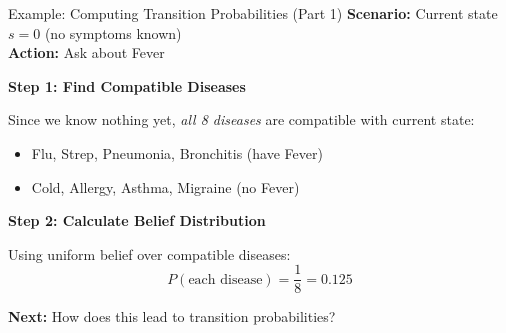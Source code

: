 \documentclass[aspectratio=169]{beamer}
\begin{document}
\begin{frame}{Example: Computing Transition Probabilities (Part 1)}
    \textbf{Scenario:} Current state $s = 0$ (no symptoms known)\\
    \textbf{Action:} Ask about Fever
    
    \vspace{0.5cm}
    
    \textbf{Step 1: Find Compatible Diseases}
    
    \vspace{0.2cm}
    
    Since we know nothing yet, \emph{all 8 diseases} are compatible with current state:
    \begin{itemize}
        \item Flu, Strep, Pneumonia, Bronchitis (have Fever)
        \item Cold, Allergy, Asthma, Migraine (no Fever)
    \end{itemize}
    
    \vspace{0.5cm}
    
    \textbf{Step 2: Calculate Belief Distribution}
    
    \vspace{0.2cm}
    
    Using uniform belief over compatible diseases:
    \[P(\text{each disease}) = \frac{1}{8} = 0.125\]
    
    \vspace{0.3cm}
    
    \textbf{Next:} How does this lead to transition probabilities?
\end{frame}
\end{document}
